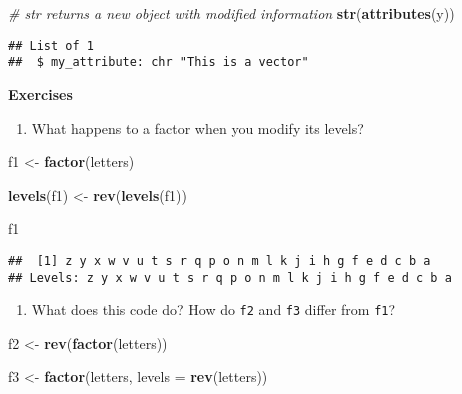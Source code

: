 \documentclass[
]{book}
\newenvironment{Shaded}{\begin{snugshade}}{\end{snugshade}}
\newcommand{\CommentTok}[1]{\textcolor[rgb]{0.56,0.35,0.01}{\textit{#1}}}
\newcommand{\DataTypeTok}[1]{\textcolor[rgb]{0.13,0.29,0.53}{#1}}
\newcommand{\KeywordTok}[1]{\textcolor[rgb]{0.13,0.29,0.53}{\textbf{#1}}}
\newcommand{\NormalTok}[1]{#1}
\newcommand{\StringTok}[1]{\textcolor[rgb]{0.31,0.60,0.02}{#1}}
\providecommand{\tightlist}{%
  \setlength{\itemsep}{0pt}\setlength{\parskip}{0pt}}
\begin{document}
\begin{Shaded}
\begin{Highlighting}[]
\CommentTok{\# str returns a new object with modified information}
\KeywordTok{str}\NormalTok{(}\KeywordTok{attributes}\NormalTok{(y))}
\end{Highlighting}
\end{Shaded}

\begin{verbatim}
## List of 1
##  $ my_attribute: chr "This is a vector"
\end{verbatim}

\textbf{Exercises}

\begin{enumerate}
\def\labelenumi{\arabic{enumi}.}
\tightlist
\item
  What happens to a factor when you modify its levels?
\end{enumerate}

\begin{Shaded}
\begin{Highlighting}[]
\NormalTok{f1 \textless{}{-}}\StringTok{ }\KeywordTok{factor}\NormalTok{(letters)}

\KeywordTok{levels}\NormalTok{(f1) \textless{}{-}}\StringTok{ }\KeywordTok{rev}\NormalTok{(}\KeywordTok{levels}\NormalTok{(f1))}

\NormalTok{f1}
\end{Highlighting}
\end{Shaded}

\begin{verbatim}
##  [1] z y x w v u t s r q p o n m l k j i h g f e d c b a
## Levels: z y x w v u t s r q p o n m l k j i h g f e d c b a
\end{verbatim}

\begin{enumerate}
\def\labelenumi{\arabic{enumi}.}
\setcounter{enumi}{1}
\tightlist
\item
  What does this code do? How do \texttt{f2} and \texttt{f3} differ from \texttt{f1}?
\end{enumerate}

\begin{Shaded}
\begin{Highlighting}[]
\NormalTok{f2 \textless{}{-}}\StringTok{ }\KeywordTok{rev}\NormalTok{(}\KeywordTok{factor}\NormalTok{(letters))}

\NormalTok{f3 \textless{}{-}}\StringTok{ }\KeywordTok{factor}\NormalTok{(letters, }\DataTypeTok{levels =} \KeywordTok{rev}\NormalTok{(letters))}
\end{Highlighting}
\end{Shaded}
\end{document}
